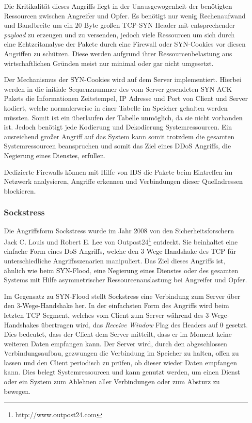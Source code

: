 Die Kritikalität dieses Angriffs liegt in der Unausgewogenheit der benötigten Ressourcen zwischen Angreifer und Opfer. Es benötigt nur wenig Rechenaufwand und Bandbreite um ein 20 Byte großen \ac{TCP}-SYN Header mit entsprechender \textit{payload} zu erzeugen und zu versenden, jedoch viele Ressourcen um sich durch eine Echtzeitanalyse der Pakete durch eine Firewall oder SYN-Cookies vor diesen Angriffen zu schützen. Diese werden aufgrund ihrer Ressourcenbelastung aus wirtschaftlichen Gründen meist nur minimal oder gar nicht umgesetzt.

Der Mechanismus der SYN-Cookies wird auf dem Server implementiert. Hierbei werden in die initiale Sequenznummer des vom Server gesendeten SYN-ACK Pakets die Informationen Zeitstempel, \ac{IP} Adresse und Port von Client und Server kodiert, welche normalerweise in einer Tabelle im Speicher gehalten werden müssten. Somit ist ein überlaufen der Tabelle unmöglich, da sie nicht vorhanden ist. Jedoch benötigt jede Kodierung und Dekodierung Systemressourcen. Ein ausreichend großer Angriff auf das System kann somit trotzdem die gesamten Systemressourcen beanspruchen und somit das Ziel eines \ac{DDoS} Angriffs, die Negierung eines Dienstes, erfüllen.

Dedizierte Firewalls können mit Hilfe von \ac{IDS} die Pakete beim Eintreffen im Netzwerk analysieren, Angriffe erkennen und Verbindungen dieser Quelladressen blockieren.

\subsubsection{Sockstress}
Die Angriffsform Sockstress wurde im Jahr 2008 von den Sicherheitsforschern Jack C. Louis und Robert E. Lee von Outpost24\footnote{http://www.outpost24.com} entdeckt. Sie beinhaltet eine einfache Form eines \ac{DoS} Angriffs, welche den 3-Wege-Handshake des \ac{TCP} für unterschiedliche Angriffsszenarien manipuliert. Das Ziel dieses Angriffs ist, ähnlich wie beim SYN-Flood, eine Negierung eines Dienstes oder des gesamten Systems mit Hilfe asymmetrischer Ressourcenauslastung bei Angreifer und Opfer.

Im Gegensatz zu SYN-Flood stellt Sockstress eine Verbindung zum Server über den 3-Wege-Handshake her. In der einfachsten Form des Angriffs wird beim letzten \ac{TCP} Segment, welches vom Client zum Server während des 3-Wege-Handshakes übertragen wird, das \textit{Receive Window} Flag des Headers auf 0 gesetzt. Dies bedeutet, dass der Client dem Server mitteilt, dass er im Moment keine weiteren Daten empfangen kann. Der Server wird, durch den abgeschlossen Verbindungsaufbau, gezwungen die Verbindung im Speicher zu halten, offen zu lassen und den Client periodisch zu prüfen, ob dieser wieder Daten empfangen kann. Dies belegt Systemressourcen und kann genutzt werden, um einen Dienst oder ein System zum Ablehnen aller Verbindungen oder zum Absturz zu bewegen.

